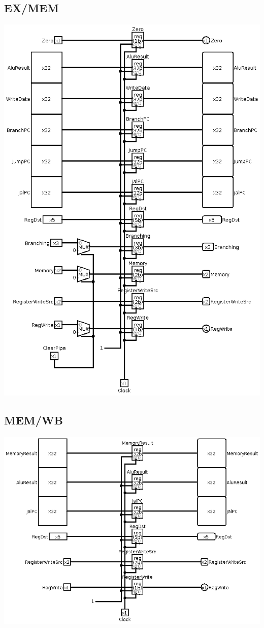 \subsection{EX/MEM}
\includegraphics[width=\textwidth]{billeder/EX/MEM.png}

\subsection{MEM/WB}
\includegraphics[width=\textwidth]{billeder/MEM/WB.png}

